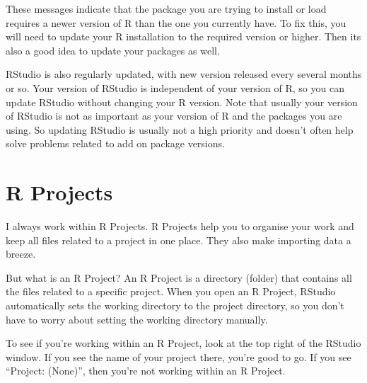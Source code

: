 \documentclass[
  letterpaper,
  8pt,
  a4paper]{book}
\begin{document}
These messages indicate that the package you are trying to install or
load requires a newer version of R than the one you currently have. To
fix this, you will need to update your R installation to the required
version or higher. Then its also a good idea to update your packages as
well.

\begin{tcolorbox}[enhanced jigsaw, arc=.35mm, bottomrule=.15mm, bottomtitle=1mm, breakable, colback=white, colbacktitle=quarto-callout-note-color!10!white, colframe=quarto-callout-note-color-frame, coltitle=black, left=2mm, leftrule=.75mm, opacityback=0, opacitybacktitle=0.6, rightrule=.15mm, title=\textcolor{quarto-callout-note-color}{\faInfo}\hspace{0.5em}{Note}, titlerule=0mm, toprule=.15mm, toptitle=1mm]

RStudio is also regularly updated, with new version released every
several months or so. Your version of RStudio is independent of your
version of R, so you can update RStudio without changing your R version.
Note that usually your version of RStudio is not as important as your
version of R and the packages you are using. So updating RStudio is
usually not a high priority and doesn't often help solve problems
related to add on package versions.

\end{tcolorbox}

\section*{R Projects}\label{r-projects}


I always work within R Projects. R Projects help you to organise your
work and keep all files related to a project in one place. They also
make importing data a breeze.

But what is an R Project? An R Project is a directory (folder) that
contains all the files related to a specific project. When you open an R
Project, RStudio automatically sets the working directory to the project
directory, so you don't have to worry about setting the working
directory manually.

To see if you're working within an R Project, look at the top right of
the RStudio window. If you see the name of your project there, you're
good to go. If you see ``Project: (None)'', then you're not working
within an R Project.
\end{document}
